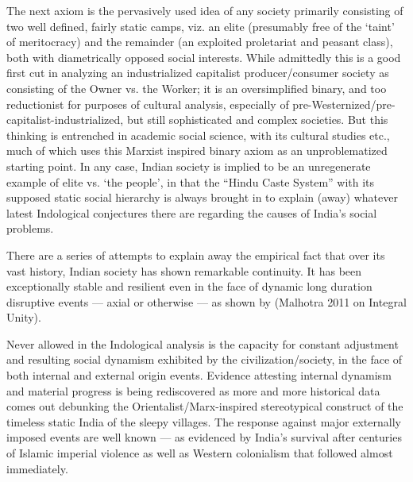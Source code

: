 The next axiom is the pervasively used idea of any society primarily consisting of two well defined, fairly static camps, viz. an elite (presumably free of the ‘taint’ of meritocracy) and the remainder (an exploited proletariat and peasant class), both with diametrically opposed social interests. While admittedly this is a good first cut in analyzing an industrialized capitalist producer/consumer society as consisting of the Owner vs. the Worker; it is an oversimplified binary, and too reductionist for purposes of cultural analysis, especially of pre-Westernized/pre-capitalist-industrialized, but still sophisticated and complex societies. But this thinking is entrenched in academic social science, with its cultural studies etc., much of which uses this Marxist inspired binary axiom as an unproblematized starting point. In any case, Indian society is implied to be an unregenerate example of elite vs. ‘the people’, in that the “Hindu Caste System” with its supposed static social hierarchy is always brought in to explain (away) whatever latest Indological conjectures there are regarding the causes of India’s social problems.

There are a series of attempts to explain away the empirical fact that over its vast history, Indian society has shown remarkable continuity. It has been exceptionally stable and resilient even in the face of dynamic long duration disruptive events --- axial or otherwise --- as shown by (Malhotra 2011 on Integral Unity).

Never allowed in the Indological analysis is the capacity for constant adjustment and resulting social dynamism exhibited by the civilization/society, in the face of both internal and external origin events. Evidence attesting internal dynamism and material progress is being rediscovered as more and more historical data comes out debunking the Orientalist/Marx-inspired stereotypical construct of the timeless static India of the sleepy villages. The response against major externally imposed events are well known --- as evidenced by India’s survival after centuries of Islamic imperial violence as well as Western colonialism that followed almost immediately.



